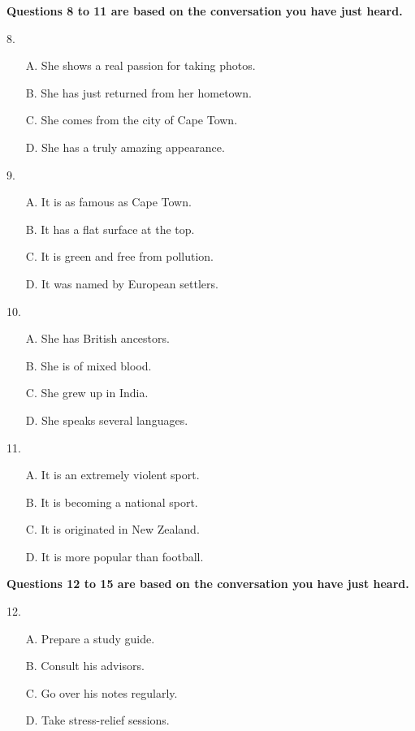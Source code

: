 \documentclass[UTF8,11pt]{ctexart}
\begin{document}
\textbf{Questions 8 to 11 are based on the conversation you have just heard.}


8.


\begin{itemize}[leftmargin=2em,itemsep=.2em,topsep=.4em]\item[A.] She shows a real passion for taking photos.
\item[B.] She has just returned from her hometown.
\item[C.] She comes from the city of Cape Town.
\item[D.] She has a truly amazing appearance.
\end{itemize}

9.


\begin{itemize}[leftmargin=2em,itemsep=.2em,topsep=.4em]\item[A.] It is as famous as Cape Town.
\item[B.] It has a flat surface at the top.
\item[C.] It is green and free from pollution.
\item[D.] It was named by European settlers.
\end{itemize}

10.


\begin{itemize}[leftmargin=2em,itemsep=.2em,topsep=.4em]\item[A.] She has British ancestors.
\item[B.] She is of mixed blood.
\item[C.] She grew up in India.
\item[D.] She speaks several languages.
\end{itemize}

11.


\begin{itemize}[leftmargin=2em,itemsep=.2em,topsep=.4em]\item[A.] It is an extremely violent sport.
\item[B.] It is becoming a national sport.
\item[C.] It is originated in New Zealand.
\item[D.] It is more popular than football.
\end{itemize}

\textbf{Questions 12 to 15 are based on the conversation you have just heard.}


12.


\begin{itemize}[leftmargin=2em,itemsep=.2em,topsep=.4em]\item[A.] Prepare a study guide.
\item[B.] Consult his advisors.
\item[C.] Go over his notes regularly.
\item[D.] Take stress-relief sessions.
\end{itemize}
\end{document}
